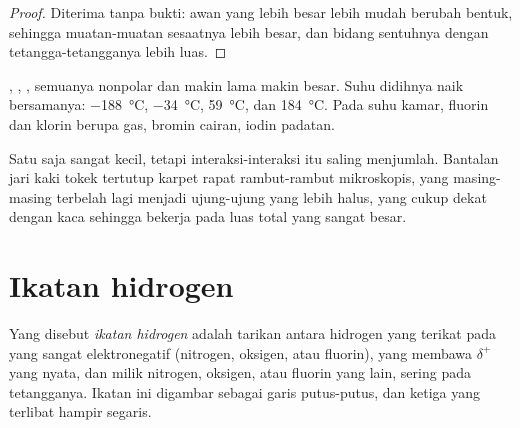 \begin{proof}
Diterima tanpa bukti: awan  yang lebih besar lebih mudah
berubah bentuk, sehingga muatan-muatan sesaatnya lebih besar, dan
bidang sentuhnya dengan tetangga-tetangganya lebih luas.
\end{proof}

\begin{example}[Halogen]\label{ex:g11:polarity-and-cohesion:halogens}
 , , ,  semuanya nonpolar
dan makin lama makin besar. Suhu didihnya naik bersamanya:
\qty{-188}{\celsius}, \qty{-34}{\celsius}, \qty{59}{\celsius}, dan
\qty{184}{\celsius}. Pada suhu kamar, fluorin dan klorin berupa gas,
bromin cairan, iodin padatan.
\end{example}

\begin{remark}[Tokek]\label{rem:g11:polarity-and-cohesion:gecko}
Satu  saja sangat kecil, tetapi interaksi-interaksi
itu saling menjumlah. Bantalan jari kaki tokek tertutup karpet rapat
rambut-rambut mikroskopis, yang masing-masing terbelah lagi menjadi
ujung-ujung yang lebih halus, yang cukup dekat dengan kaca sehingga
 bekerja pada luas total yang sangat besar.
\end{remark}

\section{Ikatan hidrogen}

\begin{definition}\label{def:g11:polarity-and-cohesion:hydrogen-bond}
Yang disebut \emph{ikatan hidrogen} adalah tarikan
antara  hidrogen yang terikat pada  yang sangat elektronegatif
(nitrogen, oksigen, atau fluorin), yang membawa $\delta^+$ yang nyata,
dan  milik  nitrogen, oksigen, atau fluorin
yang lain, sering pada  tetangganya. Ikatan ini digambar sebagai
garis putus-putus, dan ketiga  yang terlibat hampir segaris.
\end{definition}

